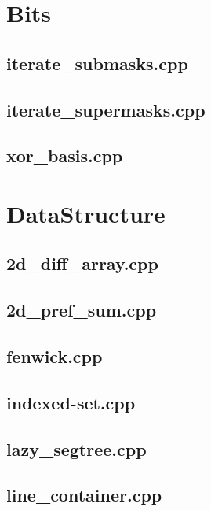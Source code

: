 \section{Bits}
\subsection{iterate\_submasks.cpp}

\subsection{iterate\_supermasks.cpp}

\subsection{xor\_basis.cpp}

\section{DataStructure}
\subsection{2d\_diff\_array.cpp}

\subsection{2d\_pref\_sum.cpp}

\subsection{fenwick.cpp}

\subsection{indexed-set.cpp}

\subsection{lazy\_segtree.cpp}

\subsection{line\_container.cpp}

